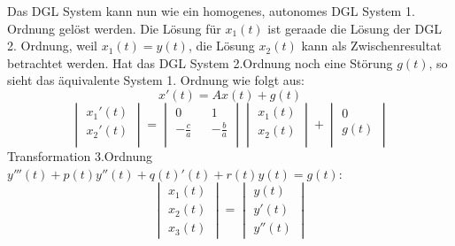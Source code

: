 Das DGL System kann nun wie ein homogenes, autonomes DGL System 1. Ordnung gelöst werden. Die Lösung für $x_1(t)$ ist geraade die Lösung der DGL 2. Ordnung, weil $x_1(t) = y(t)$, die Lösung $x_2(t)$ kann als Zwischenresultat betrachtet werden. 
Hat das DGL System 2.Ordnung noch eine Störung $g(t)$, so sieht das äquivalente System 1. Ordnung wie folgt aus:\\
\begin{equation*}
x'(t) = Ax(t) + g(t)
\end{equation*}
\begin{equation*}
	\begin{vmatrix} 
	        x_1'(t)\\ 
	        x_2'(t)\\   
	\end{vmatrix}
	=
	\begin{vmatrix} 
	        0 && 1\\ 
	       -\frac{c}{a} && -\frac{b}{a}\\   
	\end{vmatrix}
	\begin{vmatrix} 
	        x_1(t)\\ 
	        x_2(t)\\   
	\end{vmatrix}
	+
	\begin{vmatrix} 
	        0\\ 
	        g(t)\\   
	\end{vmatrix}
\end{equation*}
Transformation 3.Ordnung $y'''(t) + p(t)y''(t)+q(t)'(t)+r(t)y(t)=g(t)$:\\
\begin{equation*}
	\begin{vmatrix} 
	        x_1(t)\\ 
	        x_2(t)\\
	        x_3(t)   
	\end{vmatrix}
	=
	\begin{vmatrix} 
	        y(t)\\ 
	        y'(t)\\
	        y''(t)   
	\end{vmatrix}
\end{equation*}
